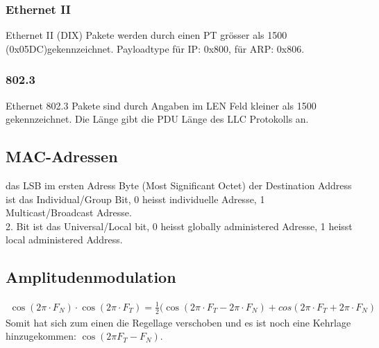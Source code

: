 \subsubsection{Ethernet II}
Ethernet II (DIX) Pakete werden durch einen PT grösser als 1500 (0x05DC)gekennzeichnet. Payloadtype für IP: 0x800, für ARP: 0x806.

\subsubsection{802.3}
Ethernet 802.3 Pakete sind durch Angaben im LEN Feld kleiner als 1500 gekennzeichnet. Die Länge gibt die PDU Länge des LLC Protokolls an.

\subsection{MAC-Adressen}
das LSB im ersten Adress Byte (Most Significant Octet) der Destination Address ist das Individual/Group Bit, 0 heisst individuelle Adresse, 1 Multicast/Broadcast Adresse.\\
2. Bit ist das Universal/Local bit, 0 heisst globally administered Adresse, 1 heisst local administered Address.



\subsection{Amplitudenmodulation}
\begin{align*}
\cos (2\pi \cdot F_N) \cdot \cos (2\pi \cdot F_T)
= \frac{1}{2}(\cos (2\pi \cdot F_T - 2\pi \cdot F_N) + cos(2\pi \cdot F_T + 2\pi \cdot F_N)
\end{align*}
Somit hat sich zum einen die Regellage verschoben und es ist noch eine Kehrlage hinzugekommen: $\cos (2\pi F_T - F_N)$.
